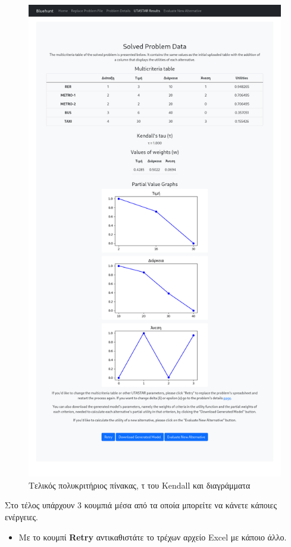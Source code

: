 \documentclass[11pt,a4paper,titlepage]{article}
\numberwithin{equation}{section}
\begin{document}
\begin{enumerate}
	\begin{figure}[H]
		\centering
		\includegraphics[width=0.8\linewidth]{media/results.png}
		\caption{Τελικός πολυκριτήριος πίνακας, τ του Kendall και διαγράμματα}
		\label{fig:results_1}
	\end{figure}
	

	Στο τέλος υπάρχουν 3 κουμπιά μέσα από τα οποία μπορείτε να κάνετε κάποιες ενέργειες.
	
	\begin{itemize}
		\item Με το κουμπί \textbf{Retry} αντικαθιστάτε το τρέχων αρχείο Excel με κάποιο άλλο.
		

\end{itemize}
\end{enumerate}
\end{document}
